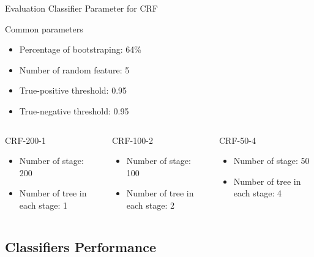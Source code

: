 \documentclass[english]{beamer}
\begin{document}
\begin{frame}
	{Evaluation}
	{Classifier Parameter for CRF}
	\begin{block}{Common parameters}
		\begin{itemize}
			\item Percentage of bootstraping: 64\%
			\item Number of random feature: 5
			\item True-positive threshold: 0.95
			\item True-negative threshold: 0.95
		\end{itemize}
	\end{block}
	\begin{columns}
		\begin{column}{0.3\textwidth}
			\begin{block}{CRF-200-1}
				\begin{itemize}
					\item Number of stage: 200
					\item Number of tree in each stage: 1
				\end{itemize}
			\end{block}
		\end{column}

		\begin{column}{0.3\textwidth}
			\begin{block}{CRF-100-2}
				\begin{itemize}
					\item Number of stage: 100
					\item Number of tree in each stage: 2
				\end{itemize}
			\end{block}
		\end{column}

		\begin{column}{0.3\textwidth}
			\begin{block}{CRF-50-4}
				\begin{itemize}
					\item Number of stage: 50
					\item Number of tree in each stage: 4
				\end{itemize}
			\end{block}
		\end{column}
	\end{columns}
\end{frame}


\subsection{Classifiers Performance}
\end{document}
